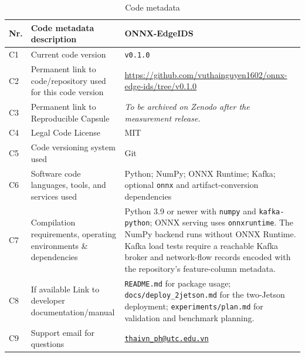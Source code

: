 \begin{table}[t]
\caption*{Code metadata}
\small
\renewcommand{\arraystretch}{1.18}
\begin{tabularx}{\textwidth}{@{}l >{\raggedright\arraybackslash}p{} >{\raggedright\arraybackslash}X@{}}
\toprule
Nr. & Code metadata description & ONNX-EdgeIDS \\
\midrule
C1 & Current code version & \texttt{v0.1.0} \\
C2 & Permanent link to code/repository used for this code version & \url{https://github.com/vuthainguyen1602/onnx-edge-ids/tree/v0.1.0} \\
C3 & Permanent link to Reproducible Capsule & \textit{To be archived on Zenodo after the measurement release.} \\
C4 & Legal Code License & MIT \\
C5 & Code versioning system used & Git \\
C6 & Software code languages, tools, and services used & Python; NumPy; ONNX Runtime; Kafka; optional \texttt{onnx} and artifact-conversion dependencies \\
C7 & Compilation requirements, operating environments \& dependencies & Python 3.9 or newer with \texttt{numpy} and \texttt{kafka-python}; ONNX serving uses \texttt{onnxruntime}. The NumPy backend runs without ONNX Runtime. Kafka load tests require a reachable Kafka broker and network-flow records encoded with the repository's feature-column metadata. \\
C8 & If available Link to developer documentation/manual & \texttt{README.md} for package usage; \texttt{docs/deploy\_2jetson.md} for the two-Jetson deployment; \texttt{experiments/plan.md} for validation and benchmark planning. \\
C9 & Support email for questions & \href{mailto:thaivn_ph@utc.edu.vn}{\nolinkurl{thaivn_ph@utc.edu.vn}} \\
\bottomrule
\end{tabularx}
\end{table}

